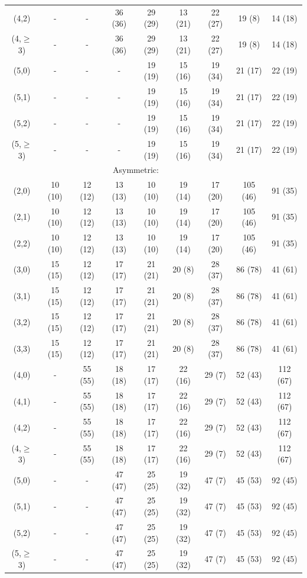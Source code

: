 \begin{table}[h!]
\begin{tabular}{ ccccccccc }
    (4,2)       & -       & -       & 36 (36) & 29 (29) & 13 (21) & 22 (27) & 19 (8)   & 14 (18)   \\
    (4,$\geq$3) & -       & -       & 36 (36) & 29 (29) & 13 (21) & 22 (27) & 19 (8)   & 14 (18)   \\
    (5,0)       & -       & -       & -       & 19 (19) & 15 (16) & 19 (34) & 21 (17)  & 22 (19)   \\
    (5,1)       & -       & -       & -       & 19 (19) & 15 (16) & 19 (34) & 21 (17)  & 22 (19)   \\
    (5,2)       & -       & -       & -       & 19 (19) & 15 (16) & 19 (34) & 21 (17)  & 22 (19)   \\
    (5,$\geq$3) & -       & -       & -       & 19 (19) & 15 (16) & 19 (34) & 21 (17)  & 22 (19)   \\
    \hline
    \multicolumn{8}{c}{Asymmetric:}                                                                \\
    (2,0)       & 10 (10) & 12 (12) & 13 (13) & 10 (10) & 19 (14) & 17 (20) & 105 (46) & 91   (35) \\
    (2,1)       & 10 (10) & 12 (12) & 13 (13) & 10 (10) & 19 (14) & 17 (20) & 105 (46) & 91   (35) \\
    (2,2)       & 10 (10) & 12 (12) & 13 (13) & 10 (10) & 19 (14) & 17 (20) & 105 (46) & 91   (35) \\
    (3,0)       & 15 (15) & 12 (12) & 17 (17) & 21 (21) & 20 (8)  & 28 (37) & 86 (78)  & 41   (61) \\
    (3,1)       & 15 (15) & 12 (12) & 17 (17) & 21 (21) & 20 (8)  & 28 (37) & 86 (78)  & 41   (61) \\
    (3,2)       & 15 (15) & 12 (12) & 17 (17) & 21 (21) & 20 (8)  & 28 (37) & 86 (78)  & 41   (61) \\
    (3,3)       & 15 (15) & 12 (12) & 17 (17) & 21 (21) & 20 (8)  & 28 (37) & 86 (78)  & 41   (61) \\
    (4,0)       & -       & 55 (55) & 18 (18) & 17 (17) & 22 (16) & 29 (7)  & 52 (43)  & 112  (67) \\
    (4,1)       & -       & 55 (55) & 18 (18) & 17 (17) & 22 (16) & 29 (7)  & 52 (43)  & 112  (67) \\
    (4,2)       & -       & 55 (55) & 18 (18) & 17 (17) & 22 (16) & 29 (7)  & 52 (43)  & 112  (67) \\
    (4,$\geq$3) & -       & 55 (55) & 18 (18) & 17 (17) & 22 (16) & 29 (7)  & 52 (43)  & 112  (67) \\
    (5,0)       & -       & -       & 47 (47) & 25 (25) & 19 (32) & 47 (7)  & 45 (53)  & 92   (45) \\
    (5,1)       & -       & -       & 47 (47) & 25 (25) & 19 (32) & 47 (7)  & 45 (53)  & 92   (45) \\
    (5,2)       & -       & -       & 47 (47) & 25 (25) & 19 (32) & 47 (7)  & 45 (53)  & 92   (45) \\
    (5,$\geq$3) & -       & -       & 47 (47) & 25 (25) & 19 (32) & 47 (7)  & 45 (53)  & 92   (45) \\
    \hline
    \hline
  \end{tabular}
\end{table}

